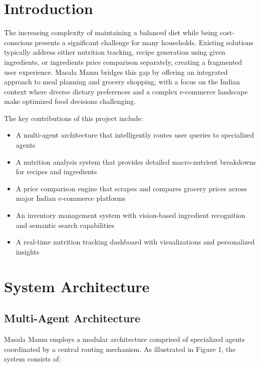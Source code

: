\documentclass{ecai}
\begin{document}
\begin{frontmatter}
\begin{abstract}
\end{abstract}

\end{frontmatter}

\section{Introduction}

The increasing complexity of maintaining a balanced diet while being cost-conscious presents a significant challenge for many households. Existing solutions typically address either nutrition tracking, recipe generation using given ingredients, or ingredients price comparison separately, creating a fragmented user experience. Masala Mamu bridges this gap by offering an integrated approach to meal planning and grocery shopping, with a focus on the Indian context where diverse dietary preferences and a complex e-commerce landscape make optimized food decisions challenging.

The key contributions of this project include:
\begin{itemize}[noitemsep,topsep=0pt]
    \item A multi-agent architecture that intelligently routes user queries to specialized agents
    \item A nutrition analysis system that provides detailed macro-nutrient breakdowns for recipes and ingredients
    \item A price comparison engine that scrapes and compares grocery prices across major Indian e-commerce platforms
    \item An inventory management system with vision-based ingredient recognition and semantic search capabilities
    \item A real-time nutrition tracking dashboard with visualizations and personalized insights
\end{itemize}

\section{System Architecture}

\subsection{Multi-Agent Architecture}

Masala Mamu employs a modular architecture comprised of specialized agents coordinated by a central routing mechanism. As illustrated in Figure 1, the system consists of:
\end{document}
